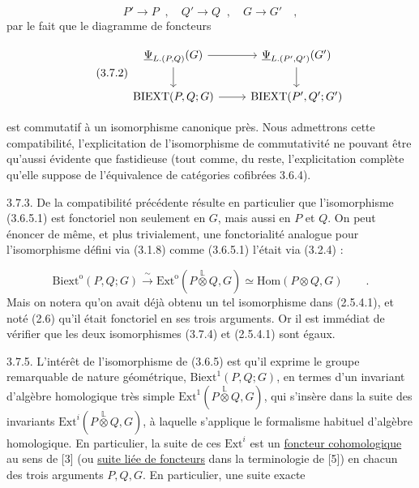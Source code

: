 \begin{equation}\tag{3.7.1}
P' \longrightarrow P \;\; , \quad Q' \longrightarrow Q \;\; , \quad G \longrightarrow G' \quad ,
\end{equation}
par le fait que le diagramme de foncteurs

\begin{equation}\tag{3.7.2}
\begin{tikzcd}
\underline{\Psi}_{L.(P,Q)}(G) \arrow[r] \arrow[d] & \underline{\Psi}_{L.(P',Q')}(G') \arrow[d] \\
\mathrm{BIEXT}(P,Q;G) \arrow[r] & \mathrm{BIEXT}(P',Q';G')
\end{tikzcd}
\end{equation}

est commutatif à un isomorphisme canonique près. Nous admettrons cette compatibilité, l'explicitation de l'isomorphisme de commutativité ne pouvant être qu'aussi évidente que fastidieuse (tout comme, du reste, l'explicitation complète qu'elle suppose de l'équivalence de catégories cofibrées 3.6.4).

3.7.3. De la compatibilité précédente résulte en particulier que l'isomorphisme (3.6.5.1) est fonctoriel non seulement en $G$, mais aussi en $P$ et $Q$. On peut énoncer de même, et plus trivialement, une fonctorialité analogue pour l'isomorphisme défini via (3.1.8) comme (3.6.5.1) l'était via (3.2.4) :

\begin{equation}\tag{3.7.4}
\mathrm{Biext}^{\mathrm{o}}(P,Q;G) \xrightarrow{\ \sim\ } \mathrm{Ext}^{\mathrm{o}}(P \overset{\mathbb{L}}{\otimes} Q,G) \simeq \mathrm{Hom}(P \otimes Q,G) \qquad .
\end{equation}
Mais on notera qu'on avait déjà obtenu un tel isomorphisme dans (2.5.4.1), et noté (2.6) qu'il était fonctoriel en ses trois arguments. Or il est immédiat de vérifier que les deux isomorphismes (3.7.4) et (2.5.4.1) sont égaux.

3.7.5. L'intérêt de l'isomorphisme de (3.6.5) est qu'il exprime le groupe remarquable de nature géométrique, $\mathrm{Biext}^{1}(P,Q;G)$, en termes d'un invariant d'algèbre homologique très simple $\mathrm{Ext}^{1}(P \overset{\mathbb{L}}{\otimes} Q,G)$, qui s'insère dans la suite des invariants $\mathrm{Ext}^{i}(P \overset{\mathbb{L}}{\otimes} Q,G)$, à laquelle s'applique le formalisme habituel d'algèbre homologique. En particulier, la suite de ces $\mathrm{Ext}^{i}$ est un \underline{foncteur cohomologique} au sens de [3] (ou \underline{suite liée de foncteurs} dans la terminologie de [5]) en chacun des trois arguments $P,Q,G$. En particulier, une suite exacte

